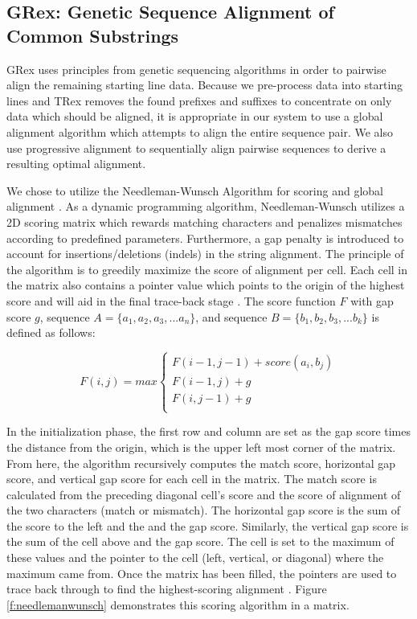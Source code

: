 \subsection{GRex: Genetic Sequence Alignment of Common Substrings}

GRex uses principles from genetic sequencing algorithms in order to pairwise align the remaining starting line data. Because we pre-process data into starting lines and TRex removes the found prefixes and suffixes to concentrate on only data which should be aligned, it is appropriate in our system to use a global alignment algorithm which attempts to align the entire sequence pair. We also use progressive alignment to sequentially align pairwise sequences to derive a resulting optimal alignment.

We chose to utilize the Needleman-Wunsch Algorithm for scoring and global alignment \cite{NEEDLEMAN1970443}. As a dynamic programming algorithm, Needleman-Wunsch utilizes a 2D scoring matrix which rewards matching characters and penalizes mismatches according to predefined parameters. Furthermore, a gap penalty is introduced to account for insertions/deletions (indels) in the string alignment. The principle of the algorithm is to greedily maximize the score of alignment per cell. Each cell in the matrix also contains a pointer value which points to the origin of the highest score and will aid in the final trace-back stage \cite{blast}. The score function $F$ with gap score $g$, sequence $A = \{a_{1}, a_{2}, a_{3},...a_{n}\}$, and sequence $B = \{b_{1}, b_{2}, b_{3},...b_{k}\}$ is defined as follows:\par

\begin{equation}
  F(i,j) = max
    \begin{cases}
    F(i-1, j-1) + score(a_{i}, b_{j}) \\
    F(i-1, j) + g \\
    F(i, j-1) + g \\
    \end{cases}
\end{equation}
\vspace{\baselineskip}

In the initialization phase, the first row and column are set as the gap score times the distance from the origin, which is the upper left most corner of the matrix. From here, the algorithm recursively computes the match score, horizontal gap score, and vertical gap score for each cell in the matrix. The match score is calculated from the preceding diagonal cell's score and the score of alignment of the two characters (match or mismatch). The horizontal gap score is the sum of the score to the left and the and the gap score. Similarly, the vertical gap score is the sum of the cell above and the gap score. The cell is set to the maximum of these values and the pointer to the cell (left, vertical, or diagonal) where the maximum came from. Once the matrix has been filled, the pointers are used to trace back through to find the highest-scoring alignment \cite{blast}. Figure \ref{f:needlemanwunsch} demonstrates this scoring algorithm in a matrix.

